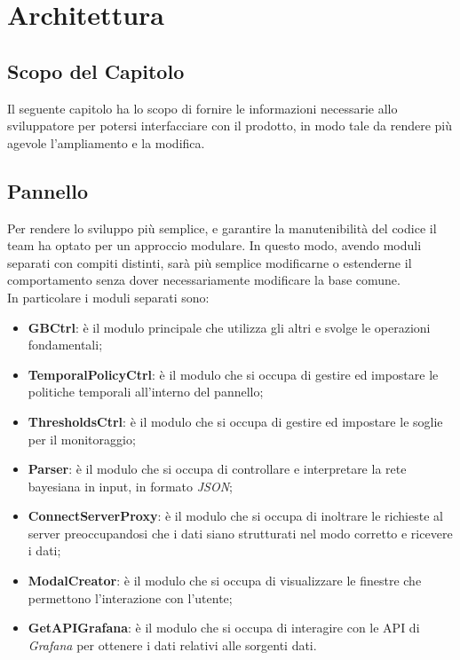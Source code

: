 \section{Architettura}\label{architettura}
\subsection{Scopo del Capitolo}
Il seguente capitolo ha lo scopo di fornire le informazioni necessarie allo sviluppatore per potersi interfacciare con il prodotto, in modo tale da rendere più agevole l'ampliamento e la modifica.

\subsection{Pannello}\label{archPannello}
Per rendere lo sviluppo più semplice, e garantire la manutenibilità del codice il team ha optato per un approccio modulare. In questo modo, avendo moduli separati con compiti distinti, sarà più semplice modificarne o estenderne il comportamento senza dover necessariamente modificare la base comune.\\
In particolare i moduli separati sono:
\begin{itemize}
	\item \textbf{GBCtrl}: è il modulo principale che utilizza gli altri e svolge le operazioni fondamentali;
	\item \textbf{TemporalPolicyCtrl}: è il modulo che si occupa di gestire ed impostare le politiche temporali all'interno del pannello;
	\item \textbf{ThresholdsCtrl}: è il modulo che si occupa di gestire ed impostare le soglie per il monitoraggio;
	\item \textbf{Parser}: è il modulo che si occupa di controllare e interpretare la rete bayesiana in input, in formato \textit{JSON};
	\item \textbf{ConnectServerProxy}: è il modulo che si occupa di inoltrare le richieste al server preoccupandosi che i dati siano strutturati nel modo corretto e ricevere i dati;
	\item \textbf{ModalCreator}: è il modulo che si occupa di visualizzare le finestre che permettono l'interazione con l'utente;
	\item \textbf{GetAPIGrafana}: è il modulo che si occupa di interagire con le API di \textit{Grafana} per ottenere i dati relativi alle sorgenti dati.
\end{itemize}

